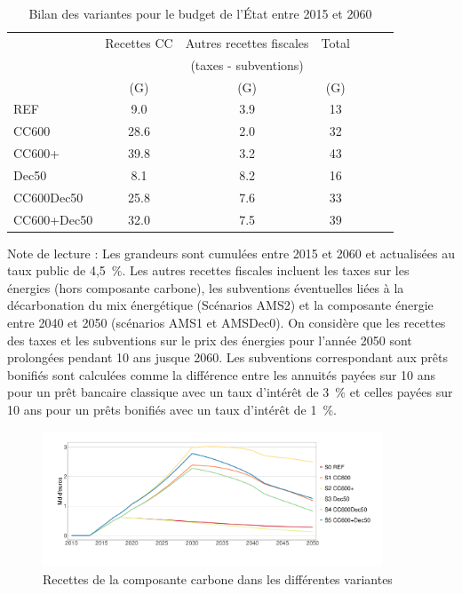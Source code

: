 \documentclass[10.5pt,a4paper]{article}
\def\euro{\mbox{\raisebox{.25ex}{{\it =}}\hspace{-.5em}{\sf C}}}
\begin{document}
{\begin{table}[h] \caption{Bilan des variantes pour le budget de l’État entre 2015 et 2060}\label{Bilan_Etat_CC}
\begin{center}
\begin{tabular}[c]{|l|c|c|c|c|c|c|}
\hline
								&Recettes CC & Autres recettes fiscales & Total \\
								& 					 & (taxes - subventions) & \\
								&		(G\euro) & (G\euro) 					& (G\euro)	 \\			
\hline
REF 				&9.0 			 &3.9 	&13 \\
CC600 			& 28.6 		 &2.0 	&32 \\
CC600+ 			&39.8 		 &3.2 	&43 \\
Dec50 			&8.1			 &8.2 	&16 \\
CC600Dec50 	&25.8			 &7.6 	&33 \\
CC600+Dec50	&32.0			 &7.5 	&39 \\
\hline
\end{tabular}
\end{center}
\footnotesize{Note de lecture : Les grandeurs sont cumulées entre 2015 et 2060 et actualisées au taux public de 4,5~\%.  Les autres recettes fiscales incluent les taxes sur les énergies (hors composante carbone), les subventions éventuelles liées à la décarbonation du mix énergétique (Scénarios AMS2) et la composante énergie entre 2040 et 2050 (scénarios AMS1 et AMSDec0). On considère que les recettes des taxes et les subventions sur le prix des énergies pour l'année 2050 sont prolongées pendant 10 ans jusque 2060. Les subventions correspondant aux prêts bonifiés sont calculées comme la différence entre les annuités payées sur 10 ans pour un prêt bancaire classique avec un taux d'intérêt de 3~\% et celles payées sur 10 ans pour un prêts bonifiés avec un taux d'intérêt de 1~\%.}
\end{table}


\begin{figure}[h!]
\centering 
\caption{Recettes de la composante carbone dans les différentes variantes}\label{Evol_Recettes_CC-1}  
\includegraphics[width = 0.9\textwidth]{Evol_Recettes_CC-1}  
\end{figure}

}
\end{document}
